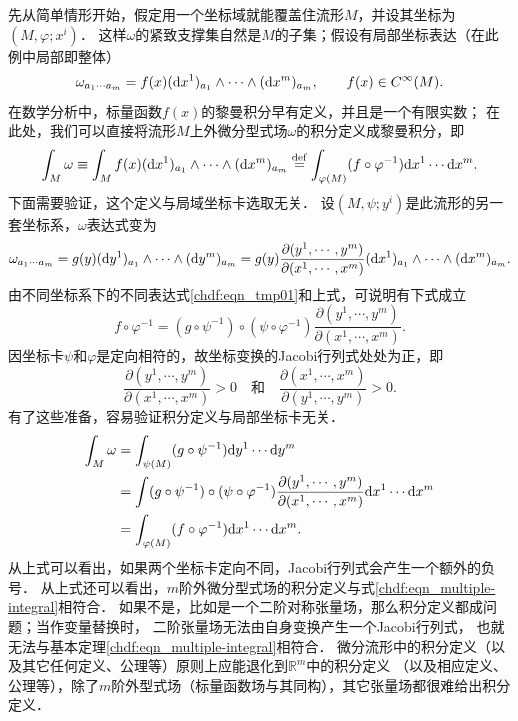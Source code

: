 先从简单情形开始，假定用一个坐标域就能覆盖住流形$M$，并设其坐标为$(M,\varphi;x^i)$．
这样$\omega$的紧致支撑集自然是$M$的子集；假设有局部坐标表达（在此例中局部即整体）
\begin{equation}\label{chdf:eqn_tmp01}
    \omega_{a_1 \cdots a_m} = f(x) ({\rm d}x^1)_{a_1} \wedge \cdots \wedge({\rm d}x^m)_{a_m},
    \qquad f(x)\in C^\infty(M).
\end{equation}
在数学分析中，标量函数$f(x)$的黎曼积分早有定义，并且是一个有限实数；
在此处，我们可以直接将流形$M$上外微分型式场$\omega$的积分定义成黎曼积分，即
\begin{equation}\label{chdf:eqn_def-integral-omega}
    \int_{M} \omega \equiv \int_{M} f(x) ({\rm d}x^1)_{a_1} \wedge \cdots \wedge({\rm d}x^m)_{a_m} \overset{\mathrm {def}}{=}
    \int_{\varphi(M)} (f\circ\varphi^{-1}) {\rm d}x^1 \cdots {\rm d}x^m .
\end{equation}
下面需要验证，这个定义与局域坐标卡选取无关．
设$(M,\psi;y^i)$是此流形的另一套坐标系，$\omega$表达式变为
\begin{equation*} %
    \omega_{a_1 \cdots a_m} = g(y) ({\rm d}y^1)_{a_1} \wedge \cdots \wedge({\rm d}y^m)_{a_m}
    =g(y)\frac{\partial (y^1,\cdots, y^m)} {\partial (x^1, \cdots, x^m)}
    ({\rm d}x^1)_{a_1} \wedge \cdots \wedge({\rm d}x^m)_{a_m}.
\end{equation*} %
由不同坐标系下的不同表达式\eqref{chdf:eqn_tmp01}和上式，可说明有下式成立
\begin{equation}\label{chdf:eqn_tmpxy1}
    f\circ\varphi^{-1} = (g\circ \psi^{-1} )\circ (\psi \circ \varphi^{-1})
    \frac{\partial (y^1,\cdots, y^m)} {\partial (x^1, \cdots,x^m)} .
\end{equation}
因坐标卡$\psi$和$\varphi$是定向相符的，故坐标变换的Jacobi行列式处处为正，即
\begin{equation}
    \frac{\partial (y^1,\cdots, y^m)} {\partial (x^1,\cdots, x^m)} > 0  \quad \text{和} \quad
    \frac{\partial (x^1,\cdots, x^m)}{\partial (y^1,\cdots, y^m)} > 0 .
\end{equation}
有了这些准备，容易验证积分定义与局部坐标卡无关．
\begin{align*}
    \int_{M} \omega & = \int_{\psi(M)} (g\circ\psi^{-1}) {\rm d}y^1 \cdots {\rm d}y^m \\
    &=\int (g\circ\psi^{-1})\circ(\psi \circ \varphi^{-1})
    \frac  {\partial (y^1,\cdots, y^m)} {\partial (x^1, \cdots, x^m)}
    {\rm d}x^1 \cdots {\rm d}x^m  \\
    &=   \int_{\varphi(M)} (f\circ\varphi^{-1}) {\rm d}x^1 \cdots {\rm d}x^m .
\end{align*}
从上式可以看出，如果两个坐标卡定向不同，Jacobi行列式会产生一个额外的负号．
从上式还可以看出，$m$阶外微分型式场的积分定义与式\eqref{chdf:eqn_multiple-integral}相符合．
如果不是，比如是一个二阶对称张量场，那么积分定义都成问题；当作变量替换时，
二阶张量场无法由自身变换产生一个Jacobi行列式，
也就无法与基本定理\eqref{chdf:eqn_multiple-integral}相符合．
微分流形中的积分定义（以及其它任何定义、公理等）原则上应能退化到$\mathbb{R}^m$中的积分定义
（以及相应定义、公理等），除了$m$阶外型式场（标量函数场与其同构），其它张量场都很难给出积分定义．

